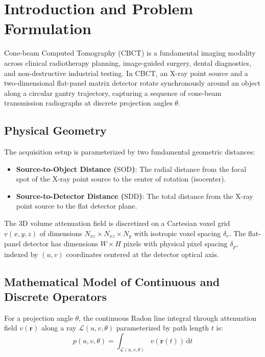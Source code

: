 \documentclass[11pt,a4paper]{article}
\begin{document}
\newpage
\begingroup
\hypersetup{linkcolor=darkslate}
\setlength{\parskip}{0.5pt}
\setcounter{tocdepth}{2}
\tableofcontents
\endgroup
\newpage

\section{Introduction and Problem Formulation}
\label{sec:intro}

Cone-beam Computed Tomography (CBCT) is a fundamental imaging modality across clinical radiotherapy planning, image-guided surgery, dental diagnostics, and non-destructive industrial testing. In CBCT, an X-ray point source and a two-dimensional flat-panel matrix detector rotate synchronously around an object along a circular gantry trajectory, capturing a sequence of cone-beam transmission radiographs at discrete projection angles $\theta$.

\subsection{Physical Geometry}
The acquisition setup is parameterized by two fundamental geometric distances:
\begin{itemize}[noitemsep,topsep=2pt]
    \item \textbf{Source-to-Object Distance ($\text{SOD}$)}: The radial distance from the focal spot of the X-ray point source to the center of rotation (isocenter).
    \item \textbf{Source-to-Detector Distance ($\text{SDD}$)}: The total distance from the X-ray point source to the flat detector plane.
\end{itemize}
The 3D volume attenuation field is discretized on a Cartesian voxel grid $v(x,y,z)$ of dimensions $N_{xz} \times N_{xz} \times N_y$ with isotropic voxel spacing $\delta_v$. The flat-panel detector has dimensions $W \times H$ pixels with physical pixel spacing $\delta_p$, indexed by $(u, v)$ coordinates centered at the detector optical axis.

\subsection{Mathematical Model of Continuous and Discrete Operators}
For a projection angle $\theta$, the continuous Radon line integral through attenuation field $v(\mathbf{r})$ along a ray $\mathcal{L}(u, v, \theta)$ parameterized by path length $t$ is:
\begin{equation}
    p(u, v, \theta) = \int_{\mathcal{L}(u, v, \theta)} v(\mathbf{r}(t)) \, \mathrm{d}t
\end{equation}
\end{document}
